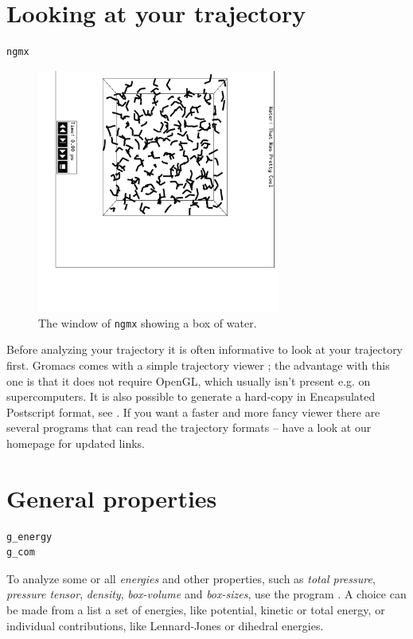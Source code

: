
\section{Looking at your trajectory}
\label{sec:lookwhostalking}
\begin{verbatim}
ngmx
\end{verbatim}

\begin{figure}
\centerline{
{\includegraphics[width=8cm,angle=90]{plots/ngmxdump}}}
\caption{The window of {\tt ngmx} showing a box of water.}
\label{fig:ngmxdump}
\end{figure}

Before analyzing your trajectory it is often informative to look at
your trajectory first. Gromacs comes with a simple trajectory
viewer {\tt {}}; the advantage with this one is that it does not
require OpenGL, which usually isn't present e.g. on supercomputers.
It is also possible to generate a
hard-copy in Encapsulated Postscript format, see
. If you want a faster and more fancy viewer
 there are several programs
that can read the {\gromacs} trajectory formats -- have a look at our
homepage {\wwwpage} for updated links. 


\section{General properties}
\label{sec:genprop}
\begin{verbatim}
g_energy
g_com
\end{verbatim}
To analyze some or all {\em energies} and other properties, such as
{\em total pressure}, {\em pressure tensor}, {\em density}, {\em
box-volume} and {\em box-sizes}, use the program {\tt {}}.  A
choice can be made from a list a set of energies, like potential,
kinetic or total energy, or individual contributions, like
Lennard-Jones or dihedral energies.

